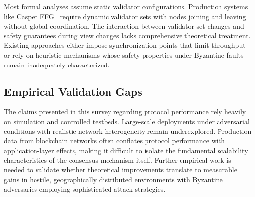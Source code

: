 Most formal analyses assume static validator configurations. Production systems like Casper FFG~\cite{buterin2020combining} require dynamic validator sets with nodes joining and leaving without global coordination. The interaction between validator set changes and safety guarantees during view changes lacks comprehensive theoretical treatment. Existing approaches either impose synchronization points that limit throughput or rely on heuristic mechanisms whose safety properties under Byzantine faults remain inadequately characterized.

\subsection{Empirical Validation Gaps}

The claims presented in this survey regarding protocol performance rely heavily on simulation and controlled testbeds. Large-scale deployments under adversarial conditions with realistic network heterogeneity remain underexplored. Production data from blockchain networks often conflates protocol performance with application-layer effects, making it difficult to isolate the fundamental scalability characteristics of the consensus mechanism itself. Further empirical work is needed to validate whether theoretical improvements translate to measurable gains in hostile, geographically distributed environments with Byzantine adversaries employing sophisticated attack strategies.
